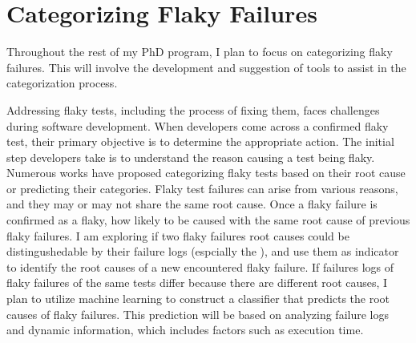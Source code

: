 \newpage
\section{Categorizing Flaky Failures}
\label{sec:categotize}

% 

Throughout the rest of my PhD program, I plan to focus on categorizing flaky failures. This will involve the development and suggestion of tools to assist in the categorization process. 

Addressing flaky tests, including the process of fixing them, faces challenges during software development. When developers come across a confirmed flaky test, their primary objective is to determine the appropriate action. The initial step developers take is to understand the reason causing a test being flaky. Numerous works have proposed categorizing flaky tests based on their root cause or predicting their categories\cite{akli2023flakycat}\cite{lam2019root}. 
Flaky test failures can arise from various reasons, and they may or may not share the same root cause. Once a flaky failure is confirmed as a flaky, how likely to be caused with the same root cause of previous flaky failures. I am exploring if two flaky failures root causes could be distingushedable by their failure logs (espcially the \failures), and use them as indicator to identify the root causes of a new encountered flaky failure. If failures logs of flaky failures of the same tests differ because there are different root causes, I plan to utilize machine learning to construct a classifier that predicts the root causes of flaky failures. This prediction will be based on analyzing failure logs and dynamic information, which includes factors such as execution time.










